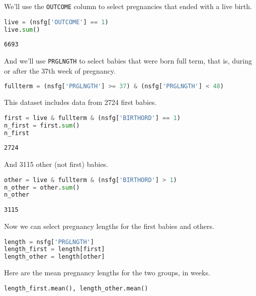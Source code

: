 We'll use the \passthrough{\lstinline!OUTCOME!} column to select
pregnancies that ended with a live birth.

\begin{lstlisting}[language=Python,style=source]
live = (nsfg['OUTCOME'] == 1)
live.sum()
\end{lstlisting}

\begin{lstlisting}[style=output]
6693
\end{lstlisting}

And we'll use \passthrough{\lstinline!PRGLNGTH!} to select babies that
were born full term, that is, during or after the 37th week of
pregnancy.

\begin{lstlisting}[language=Python,style=source]
fullterm = (nsfg['PRGLNGTH'] >= 37) & (nsfg['PRGLNGTH'] < 48)
\end{lstlisting}

This dataset includes data from 2724 first babies.

\begin{lstlisting}[language=Python,style=source]
first = live & fullterm & (nsfg['BIRTHORD'] == 1)
n_first = first.sum()
n_first
\end{lstlisting}

\begin{lstlisting}[style=output]
2724
\end{lstlisting}

\pagebreak

And 3115 other (not first) babies.

\begin{lstlisting}[language=Python,style=source]
other = live & fullterm & (nsfg['BIRTHORD'] > 1)
n_other = other.sum()
n_other
\end{lstlisting}

\begin{lstlisting}[style=output]
3115
\end{lstlisting}

Now we can select pregnancy lengths for the first babies and others.

\begin{lstlisting}[language=Python,style=source]
length = nsfg['PRGLNGTH']
length_first = length[first]
length_other = length[other]
\end{lstlisting}

Here are the mean pregnancy lengths for the two groups, in weeks.

\begin{lstlisting}[language=Python,style=source]
length_first.mean(), length_other.mean()
\end{lstlisting}

